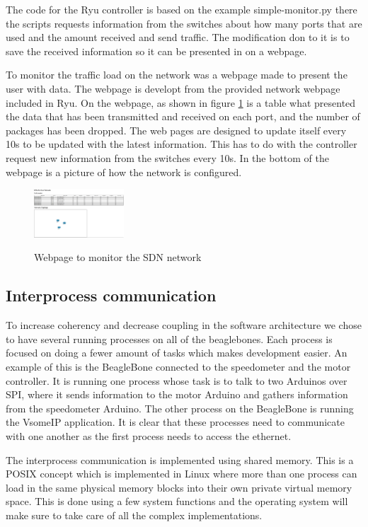 \documentclass[11pt, titlepage]{article} %
\begin{document}
The code for the Ryu controller is based on the example simple-monitor.py there the scripts requests information from the switches about how many ports that are used and the amount received and send traffic. The modification don to it is to save the received information so it can be presented in on a webpage.

To monitor the traffic load on the network was a webpage made to present the user with data. The webpage is developt from the provided network webpage included in Ryu. On the webpage, as shown in figure \ref{fig:webpage_sdn} is a table what presented the data that has been transmitted and received on each port, and the number of packages has been dropped. The web pages are designed to update itself every 10s to be updated with the latest information.  This has to do with the controller request new information from the switches every 10s.  In the bottom of the webpage is a picture of how the network is configured. 

\begin{figure}
	\includegraphics[width=0.3\textwidth]{webpage.PNG}
	\label{fig:webpage_sdn}
	\caption{Webpage to monitor the SDN network}
\end{figure}


\subsection{Interprocess communication}
To increase coherency and decrease coupling in the software architecture we chose to have several running processes on all of the beaglebones. Each process is focused on doing a fewer amount of tasks which makes development easier. An example of this is the BeagleBone connected to the speedometer and the motor controller. It is running one process whose task is to talk to two Arduinos over SPI, where it sends information to the motor Arduino and gathers information from the speedometer Arduino. The other process on the BeagleBone is running the VsomeIP application. It is clear that these processes need to communicate with one another as the first process needs to access the ethernet.

The interprocess communication is implemented using shared memory. This is a POSIX concept which is implemented in Linux where more than one process can load in the same physical memory blocks into their own private virtual memory space. This is done using a few system functions and the operating system will make sure to take care of all the complex implementations.
\end{document}
